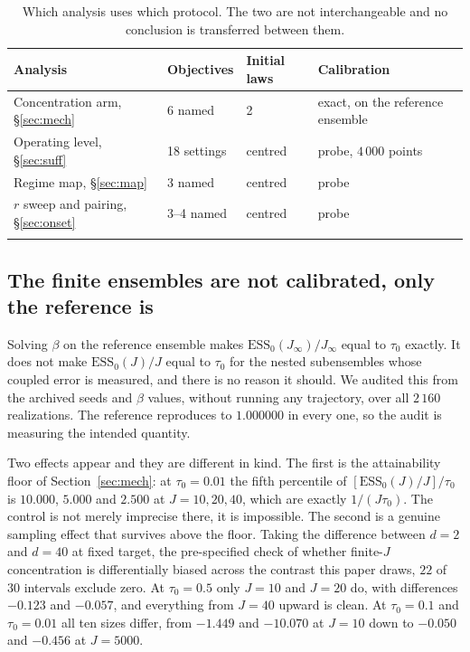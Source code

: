 \documentclass[pdflatex,sn-mathphys-num]{sn-jnl}
\theoremstyle{thmstyleone}
\theoremstyle{thmstyletwo}
\theoremstyle{thmstylethree}
\begin{document}
\begin{table}[h]
\caption{Which analysis uses which protocol. The two are not interchangeable and no conclusion is transferred between them.}\label{tab:protocol}
\begin{tabular}{@{}llll@{}}
\toprule
Analysis & Objectives & Initial laws & Calibration\\
\midrule
Concentration arm, \S\ref{sec:mech} & 6 named & 2 & exact, on the reference ensemble\\
Operating level, \S\ref{sec:suff} & 18 settings & centred & probe, $4\,000$ points\\
Regime map, \S\ref{sec:map} & 3 named & centred & probe\\
$r$ sweep and pairing, \S\ref{sec:onset} & 3--4 named & centred & probe\\
\botrule
\end{tabular}
\end{table}

\subsection{The finite ensembles are not calibrated, only the reference is}\label{sec:finitej}

Solving $\beta$ on the reference ensemble makes $\mathrm{ESS}_0(J_\infty)/J_\infty$ equal to $\tau_0$ exactly. It does not make $\mathrm{ESS}_0(J)/J$ equal to $\tau_0$ for the nested subensembles whose coupled error is measured, and there is no reason it should. We audited this from the archived seeds and $\beta$ values, without running any trajectory, over all $2\,160$ realizations. The reference reproduces to $1.000000$ in every one, so the audit is measuring the intended quantity.

Two effects appear and they are different in kind. The first is the attainability floor of Section~\ref{sec:mech}: at $\tau_0=0.01$ the fifth percentile of $[\mathrm{ESS}_0(J)/J]/\tau_0$ is $10.000$, $5.000$ and $2.500$ at $J=10,20,40$, which are exactly $1/(J\tau_0)$. The control is not merely imprecise there, it is impossible. The second is a genuine sampling effect that survives above the floor. Taking the difference between $d=2$ and $d=40$ at fixed target, the pre-specified check of whether finite-$J$ concentration is differentially biased across the contrast this paper draws, $22$ of $30$ intervals exclude zero. At $\tau_0=0.5$ only $J=10$ and $J=20$ do, with differences $-0.123$ and $-0.057$, and everything from $J=40$ upward is clean. At $\tau_0=0.1$ and $\tau_0=0.01$ all ten sizes differ, from $-1.449$ and $-10.070$ at $J=10$ down to $-0.050$ and $-0.456$ at $J=5000$.
\end{document}
